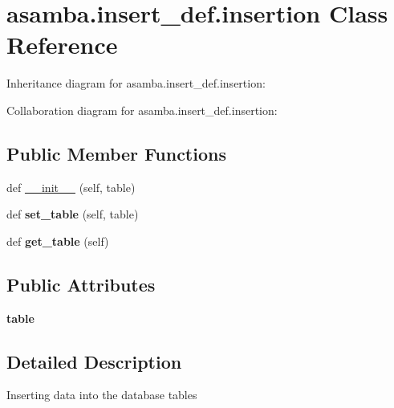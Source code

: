 \hypertarget{classasamba_1_1insert__def_1_1insertion}{}\section{asamba.\+insert\+\_\+def.\+insertion Class Reference}
\label{classasamba_1_1insert__def_1_1insertion}


Inheritance diagram for asamba.\+insert\+\_\+def.\+insertion\+:


Collaboration diagram for asamba.\+insert\+\_\+def.\+insertion\+:
\subsection*{Public Member Functions}
\begin{DoxyCompactItemize}
\item 
def \hyperlink{classasamba_1_1insert__def_1_1insertion_a0e4e59d72941182ec69091fc07d6cef0}{\+\_\+\+\_\+init\+\_\+\+\_\+} (self, table)
\item 
\mbox{\label{classasamba_1_1insert__def_1_1insertion_a5b4f042cbf109ed685775bedce7b98b6}} 
def {\bfseries set\+\_\+table} (self, table)
\item 
\mbox{\label{classasamba_1_1insert__def_1_1insertion_aeba8c7a346ddc819949ff194af0b4690}} 
def {\bfseries get\+\_\+table} (self)
\end{DoxyCompactItemize}
\subsection*{Public Attributes}
\begin{DoxyCompactItemize}
\item 
\mbox{\label{classasamba_1_1insert__def_1_1insertion_a47a62132fc8d77aee73fa5d08dbf6ce2}} 
{\bfseries table}
\end{DoxyCompactItemize}


\subsection{Detailed Description}
\begin{DoxyVerb}Inserting data into the database tables
\end{DoxyVerb}
 

